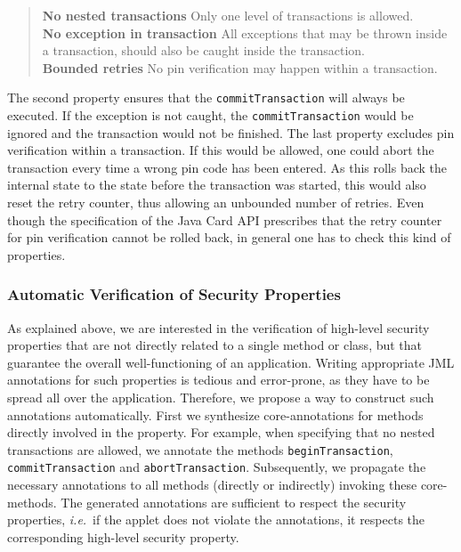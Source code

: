 \begin{quote}
\textbf{No nested transactions} Only one level of transactions
is allowed.\smallskip\\
\textbf{No exception in transaction} All exceptions that may be thrown
inside a transaction, should also be caught inside the
transaction.\smallskip\\
\textbf{Bounded retries}
No pin verification may happen within a transaction.
\end{quote} 
The second property ensures that the \texttt{commitTransaction} will
always be executed. If the exception is not caught, the
\texttt{commitTransaction} would be ignored and the transaction would
not be finished. The last property excludes pin verification within a
transaction. If this would be allowed, one could abort the transaction
every time a wrong pin code has been entered. As this rolls
back the internal state to the state before the transaction was
started, this would also reset the retry counter, thus allowing an
unbounded number of retries. Even though the specification of the Java
Card API prescribes that the retry counter for pin verification cannot
be rolled back, in general one has to check this kind of properties.



\subsubsection{Automatic Verification of Security Properties}\label{SecVerif}
As explained above, we are interested in the verification of
high-level security properties that are not directly related to a
single method or class, but that guarantee the overall
well-functioning of an application. Writing appropriate JML
annotations for such properties is tedious and error-prone, as they
have to be spread all over the application. Therefore, we propose a
way to construct such annotations automatically. First we synthesize
core-annotations for methods directly involved in the property.  For
example, when specifying that no nested transactions are allowed, we
annotate the methods \texttt{beginTransaction},
\texttt{commitTransaction} and
\texttt{abortTransaction}. Subsequently, we propagate the necessary 
annotations to all methods (directly or indirectly) invoking these
core-methods.  The generated annotations are sufficient to respect the
security properties, \emph{i.e.}~if the applet does not violate the
annotations, it respects the corresponding high-level security
property.

